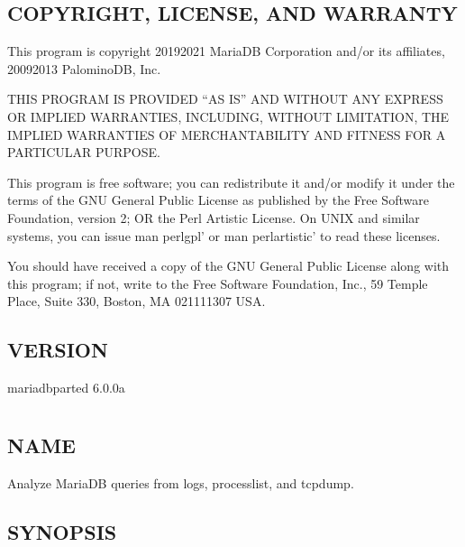 \documentclass[letterpaper,10pt,english]{sphinxmanual}
\begin{document}
\section{COPYRIGHT, LICENSE, AND WARRANTY}
\label{\detokenize{mariadb-parted-fat:copyright-license-and-warranty}}
This program is copyright 2019\sphinxhyphen{}2021 MariaDB Corporation and/or its affiliates,
2009\sphinxhyphen{}2013 PalominoDB, Inc.

THIS PROGRAM IS PROVIDED “AS IS” AND WITHOUT ANY EXPRESS OR IMPLIED
WARRANTIES, INCLUDING, WITHOUT LIMITATION, THE IMPLIED WARRANTIES OF
MERCHANTABILITY AND FITNESS FOR A PARTICULAR PURPOSE.

This program is free software; you can redistribute it and/or modify it under
the terms of the GNU General Public License as published by the Free Software
Foundation, version 2; OR the Perl Artistic License.  On UNIX and similar
systems, you can issue \textasciigrave{}man perlgpl’ or \textasciigrave{}man perlartistic’ to read these
licenses.

You should have received a copy of the GNU General Public License along with
this program; if not, write to the Free Software Foundation, Inc., 59 Temple
Place, Suite 330, Boston, MA  02111\sphinxhyphen{}1307  USA.


\section{VERSION}
\label{\detokenize{mariadb-parted-fat:version}}
mariadb\sphinxhyphen{}parted 6.0.0a


\chapter{}
\label{\detokenize{mariadb-query-digest:mariadb-query-digest}}\label{\detokenize{mariadb-query-digest::doc}}

\section{NAME}
\label{\detokenize{mariadb-query-digest:name}}
 \sphinxhyphen{} Analyze MariaDB queries from logs, processlist, and tcpdump.


\section{SYNOPSIS}
\label{\detokenize{mariadb-query-digest:synopsis}}
\end{document}

